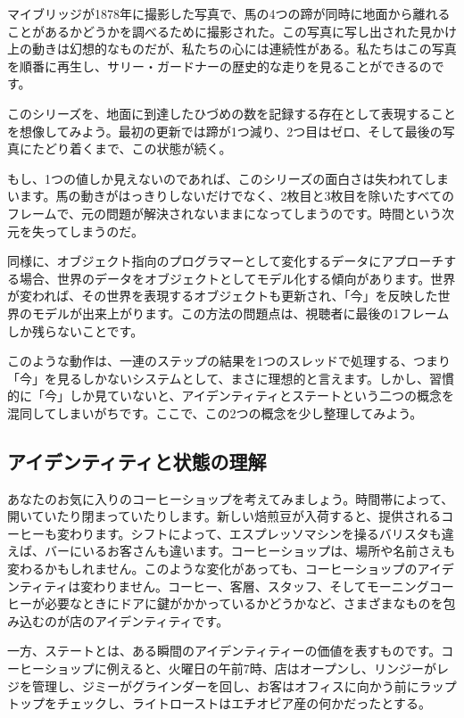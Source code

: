 マイブリッジが1878年に撮影した写真で、馬の4つの蹄が同時に地面から離れることがあるかどうかを調べるために撮影された。この写真に写し出された見かけ上の動きは幻想的なものだが、私たちの心には連続性がある。私たちはこの写真を順番に再生し、サリー・ガードナーの歴史的な走りを見ることができるのです。

このシリーズを、地面に到達したひづめの数を記録する存在として表現することを想像してみよう。最初の更新では蹄が1つ減り、2つ目はゼロ、そして最後の写真にたどり着くまで、この状態が続く。

もし、1つの値しか見えないのであれば、このシリーズの面白さは失われてしまいます。馬の動きがはっきりしないだけでなく、2枚目と3枚目を除いたすべてのフレームで、元の問題が解決されないままになってしまうのです。時間という次元を失ってしまうのだ。

同様に、オブジェクト指向のプログラマーとして変化するデータにアプローチする場合、世界のデータをオブジェクトとしてモデル化する傾向があります。世界が変われば、その世界を表現するオブジェクトも更新され、「今」を反映した世界のモデルが出来上がります。この方法の問題点は、視聴者に最後の1フレームしか残らないことです。

このような動作は、一連のステップの結果を1つのスレッドで処理する、つまり「今」を見るしかないシステムとして、まさに理想的と言えます。しかし、習慣的に「今」しか見ていないと、アイデンティティとステートという二つの概念を混同してしまいがちです。ここで、この2つの概念を少し整理してみよう。



\subsection{アイデンティティと状態の理解}

あなたのお気に入りのコーヒーショップを考えてみましょう。時間帯によって、開いていたり閉まっていたりします。新しい焙煎豆が入荷すると、提供されるコーヒーも変わります。シフトによって、エスプレッソマシンを操るバリスタも違えば、バーにいるお客さんも違います。コーヒーショップは、場所や名前さえも変わるかもしれません。このような変化があっても、コーヒーショップのアイデンティティは変わりません。コーヒー、客層、スタッフ、そしてモーニングコーヒーが必要なときにドアに鍵がかかっているかどうかなど、さまざまなものを包み込むのが店のアイデンティティです。

一方、ステートとは、ある瞬間のアイデンティティーの価値を表すものです。コーヒーショップに例えると、火曜日の午前7時、店はオープンし、リンジーがレジを管理し、ジミーがグラインダーを回し、お客はオフィスに向かう前にラップトップをチェックし、ライトローストはエチオピア産の何かだったとする。

